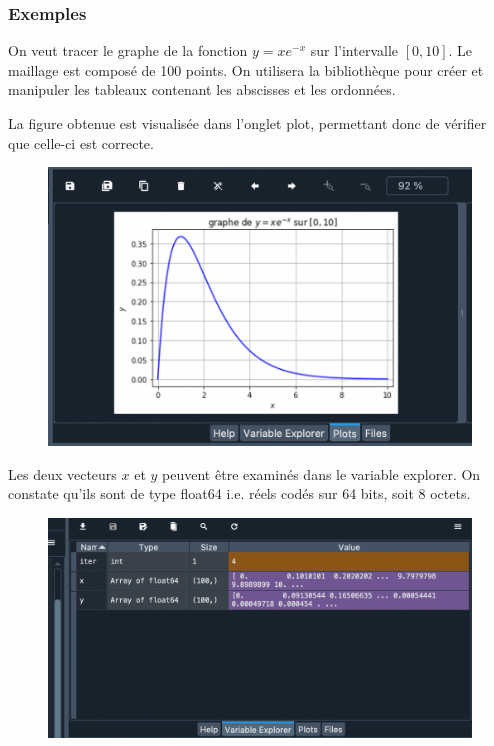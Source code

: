 \documentclass[a4paper,12pt]{article}
\begin{document}
\subsubsection{Exemples}
\begin{leftbar}
On veut tracer le graphe de la fonction $y=x e^{-x}$ sur l'intervalle $[0,10]$. Le maillage est composé de 100 points. On utilisera la bibliothèque  pour créer et manipuler les tableaux contenant les abscisses et les ordonnées.
\end{leftbar}

 

La figure obtenue est visualisée dans l'onglet plot, permettant donc de vérifier que celle-ci est correcte.
\begin{figure}[h]
\begin{center}
\includegraphics[width=14cm]{./png/plots-courbe.png}
\end{center}
\end{figure}

Les deux vecteurs $x$ et $y$ peuvent être examinés dans le variable explorer. On constate qu'ils sont de type float64 i.e. réels codés sur 64 bits, soit 8 octets.
\begin{figure}[h]
\begin{center}
\includegraphics[width=14cm]{./png/variable-explorer-courbe.png}
\end{center}
\end{figure}
\end{document}

